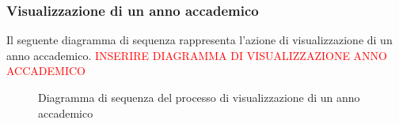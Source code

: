 		\subsubsection{Visualizzazione di un anno accademico}
		Il seguente diagramma di sequenza rappresenta l'azione di visualizzazione di un anno accademico.
		{\textcolor{red}{INSERIRE DIAGRAMMA DI VISUALIZZAZIONE ANNO ACCADEMICO}}
		\begin{figure}[h]
			\centering
			\caption{Diagramma di sequenza del processo di visualizzazione di un anno accademico}
			\label{}
		\end{figure}
	
	
	
	
	